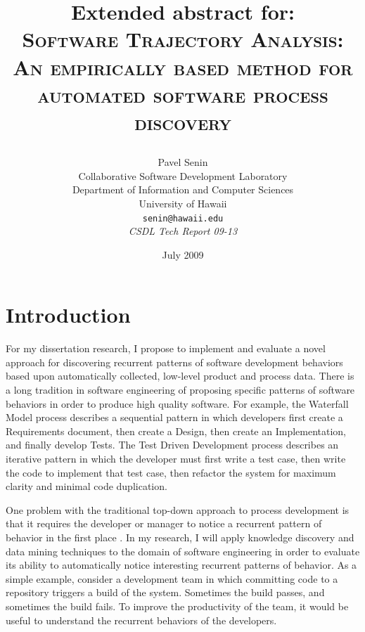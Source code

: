 \documentclass[11pt,oneside]{article}
\begin{document}
\title{Extended abstract for: \\
       \textsc{Software Trajectory Analysis:} \\
       \textsc{An empirically based method for automated software process discovery} \\
       \author{Pavel Senin \\
							 Collaborative Software Development Laboratory \\
               Department of Information and Computer Sciences \\
               University of Hawaii \\[0.3cm]
               \texttt{senin@hawaii.edu} \\[0.3cm]
               \emph{CSDL Tech Report 09-13}
       }
       \date{July 2009}
}
\maketitle


\section{Introduction}
For my dissertation research, I propose to implement and evaluate a novel approach for discovering recurrent patterns of software development behaviors based upon automatically collected, low-level product and process data. There is a long tradition in software engineering of proposing specific patterns of software behaviors in order to produce high quality software. For example, the Waterfall Model process describes a sequential pattern in which developers first create a Requirements document, then create a Design, then create an Implementation, and finally develop Tests. The Test Driven Development process describes an iterative pattern in which the developer must first write a test case, then write the code to implement that test case, then refactor the system for maximum clarity and minimal code duplication.

One problem with the traditional top-down approach to process development is that it requires the developer or manager to notice a recurrent pattern of behavior in the first place \cite{citeulike:5043104}. In my research, I will apply knowledge discovery and data mining techniques to the domain of software engineering in order to evaluate its ability to automatically notice interesting recurrent patterns of behavior. As a simple example, consider a development team in which committing code to a repository triggers a build of the system. Sometimes the build passes, and sometimes the build fails. To improve the productivity of the team, it would be useful to understand the recurrent behaviors of the developers. 
\end{document}
